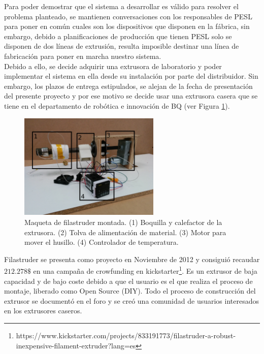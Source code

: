 Para poder demostrar que el sistema a desarrollar es válido para resolver el problema planteado, se mantienen conversaciones con los responsables de PESL para poner en común cuales son los dispositivos que disponen en la fábrica, sin embargo, debido a planificaciones de producción que tienen PESL solo se disponen de dos líneas de extrusión, resulta imposible destinar una línea de fabricación para poner en marcha nuestro sistema.\\

Debido a ello, se decide adquirir una extrusora de laboratorio y poder implementar el sistema en ella desde su instalación por parte del distribuidor. Sin embargo, los plazos de entrega estipulados, se alejan de la fecha de presentación del presente proyecto y por ese motivo se decide usar una extrusora casera que se tiene en el departamento de robótica e innovación de BQ (ver Figura \ref{fig:hardware_filastruder}).

    \begin{figure}[H]
            \centering
            \includegraphics[width=0.6\textwidth]{images/filaextruder/IMG_20150313_11163.jpg}
            \caption[Maqueta de filastruder montada]{Maqueta de filastruder montada. (1) Boquilla y calefactor de la extrusora. (2) Tolva de alimentación de material. (3) Motor para mover el husillo. (4) Controlador de temperatura.}
            \label{fig:hardware_filastruder}
    \end{figure}

Filastruder se presenta como proyecto en Noviembre de 2012 \cite{filastruder} y consiguió recaudar $212.278 \$$ en una campaña de crowfunding en kickstarter\footnote{https://www.kickstarter.com/projects/833191773/filastruder-a-robust-inexpensive-filament-extruder?lang=es}. Es un extrusor de baja capacidad y de bajo coste debido a que el usuario es el que realiza el proceso de montaje, liberado como Open Source (DIY). Todo el proceso de construcción del extrusor se documentó en el foro y se creó una comunidad de usuarios interesados en los extrusores caseros.\\

